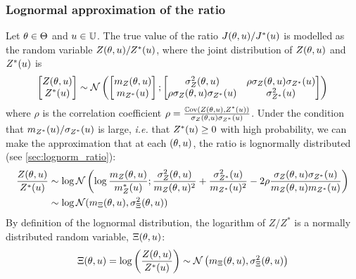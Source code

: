 \documentclass[../../Main_ManuscritThese.tex]{subfiles}
\begin{document}
\subsubsection{Lognormal approximation of the ratio}
\label{ssec:lognormal_approx}
Let $\theta\in\Theta$ and $u\in\mathbb{U}$.  The true value of the ratio
$J(\theta,u)/J^*(u)$ is modelled as the random variable
$Z(\theta,u)/Z^*(u)$, where the joint distribution of $Z(\theta, u)$
and $Z^*(u)$ is
\begin{equation}
  \begin{bmatrix}
    Z(\theta, u) \\ Z^*(u)
  \end{bmatrix}
  \sim \mathcal{N}\left(
    \begin{bmatrix}
      m_Z(\theta, u) \\ m_{Z^*}(u)
    \end{bmatrix}
    ;
    \begin{bmatrix}
      \sigma^2_Z(\theta, u) &\rho \sigma_Z(\theta, u)\sigma_{Z^*}(u) \\
      \rho \sigma_Z(\theta, u)\sigma_{Z^*}(u) & \sigma^2_{Z^*}(u) 
    \end{bmatrix}
  \right)
\end{equation}
where $\rho$ is the correlation coefficient $\rho = \frac{\mathbb{C}\mathrm{ov}\left(Z(\theta, u), Z^*(u)\right)}{\sigma_Z(\theta, u)\sigma_{Z^*}(u)}$.
Under the condition that $m_{Z^*}(u)/\sigma_{Z^*}(u)$ is large,
\textit{i.e.} that $Z^*(u) \geq 0$ with high probability, we can
make the approximation that at each $(\theta, u)$, the ratio is
lognormally distributed (see \cref{sec:lognorm_ratio}):
\begin{align}
  \label{eq:log_ratio_eq}
  \frac{Z(\theta, u)}{Z^*(u)}&\sim \log \mathcal{N}\left(\log\frac{m_Z(\theta, u)}{m_{Z}^*(u)};\frac{\sigma^2_Z(\theta, u)}{m_Z(\theta, u)^2}+\frac{\sigma^2_{Z^*}(u)}{m_{{Z^*}}(u)^2} -  2 \rho \frac{\sigma_Z(\theta,u) \sigma_{Z^*}(u)}{m_{Z}(\theta, u)m_{Z^*}(u)}\right) \\
  &\sim \log\mathcal{N}(m_{\Xi}(\theta, u), \sigma^2_{\Xi}(\theta, u))
\end{align}
By definition of the lognormal distribution, the logarithm of $Z/ Z^*$
is a normally distributed random variable, $\Xi(\theta, u)$:
\begin{equation}
  \label{eq:log_ratio}
  \Xi(\theta,u) =  \log\left(\frac{Z(\theta, u)}{Z^*(u)}\right)\sim \mathcal{N}\left(m_{\Xi}(\theta, u),\sigma_{\Xi}^2(\theta, u)\right)
\end{equation}
\end{document}
